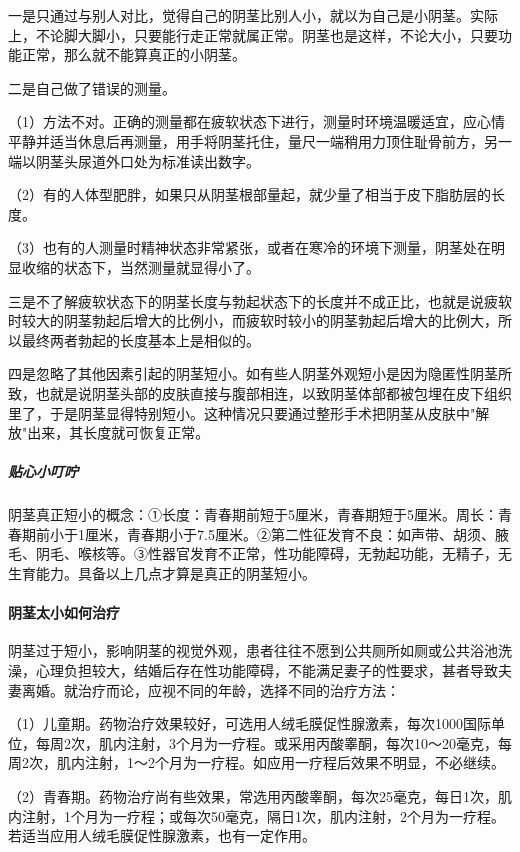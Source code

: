 \begin{enumerate}
一是只通过与别人对比，觉得自己的阴茎比别人小，就以为自己是小阴茎。实际上，不论脚大脚小，只要能行走正常就属正常。阴茎也是这样，不论大小，只要功能正常，那么就不能算真正的小阴茎。

二是自己做了错误的测量。

（1）方法不对。正确的测量都在疲软状态下进行，测量时环境温暖适宜，应心情平静并适当休息后再测量，用手将阴茎托住，量尺一端稍用力顶住耻骨前方，另一端以阴茎头尿道外口处为标准读出数字。

（2）有的人体型肥胖，如果只从阴茎根部量起，就少量了相当于皮下脂肪层的长度。

（3）也有的人测量时精神状态非常紧张，或者在寒冷的环境下测量，阴茎处在明显收缩的状态下，当然测量就显得小了。

三是不了解疲软状态下的阴茎长度与勃起状态下的长度并不成正比，也就是说疲软时较大的阴茎勃起后增大的比例小，而疲软时较小的阴茎勃起后增大的比例大，所以最终两者勃起的长度基本上是相似的。

四是忽略了其他因素引起的阴茎短小。如有些人阴茎外观短小是因为隐匿性阴茎所致，也就是说阴茎头部的皮肤直接与腹部相连，以致阴茎体部都被包埋在皮下组织里了，于是阴茎显得特别短小。这种情况只要通过整形手术把阴茎从皮肤中"解放"出来，其长度就可恢复正常。

\subparagraph{贴心小叮咛}

阴茎真正短小的概念：①长度：青春期前短于5厘米，青春期短于5厘米。周长：青春期前小于1厘米，青春期小于7.5厘米。②第二性征发育不良：如声带、胡须、腋毛、阴毛、喉核等。③性器官发育不正常，性功能障碍，无勃起功能，无精子，无生育能力。具备以上几点才算是真正的阴茎短小。

\paragraph{阴茎太小如何治疗}

阴茎过于短小，影响阴茎的视觉外观，患者往往不愿到公共厕所如厕或公共浴池洗澡，心理负担较大，结婚后存在性功能障碍，不能满足妻子的性要求，甚者导致夫妻离婚。就治疗而论，应视不同的年龄，选择不同的治疗方法：

（1）儿童期。药物治疗效果较好，可选用人绒毛膜促性腺激素，每次1000国际单位，每周2次，肌内注射，3个月为一疗程。或采用丙酸睾酮，每次10～20毫克，每周2次，肌内注射，1～2个月为一疗程。如应用一疗程后效果不明显，不必继续。

（2）青春期。药物治疗尚有些效果，常选用丙酸睾酮，每次25毫克，每日1次，肌内注射，1个月为一疗程；或每次50毫克，隔日1次，肌内注射，2个月为一疗程。若适当应用人绒毛膜促性腺激素，也有一定作用。


\end{enumerate}
